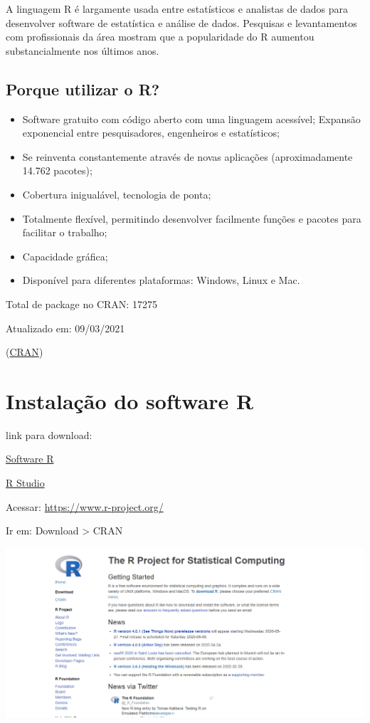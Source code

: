 \documentclass[
]{book}
\providecommand{\tightlist}{%
  \setlength{\itemsep}{0pt}\setlength{\parskip}{0pt}}
\begin{document}
A linguagem R é largamente usada entre estatísticos e analistas de dados para desenvolver software de estatística e análise de dados. Pesquisas e levantamentos com profissionais da área mostram que a popularidade do R aumentou substancialmente nos últimos anos.

\hypertarget{porque-utilizar-o-r}{%
\section{Porque utilizar o R?}\label{porque-utilizar-o-r}}

\begin{itemize}
\tightlist
\item
  Software gratuito com código aberto com uma linguagem acessível; Expansão exponencial entre pesquisadores, engenheiros e estatísticos;
\item
  Se reinventa constantemente através de novas aplicações (aproximadamente 14.762 pacotes);
\item
  Cobertura inigualável, tecnologia de ponta;
\item
  Totalmente flexível, permitindo desenvolver facilmente funções e pacotes para facilitar o trabalho;
\item
  Capacidade gráfica;
\item
  Disponível para diferentes plataformas: Windows, Linux e Mac.
\end{itemize}

Total de package no CRAN: 17275

Atualizado em: 09/03/2021

(\href{https://cran.r-project.org/web/packages/}{CRAN})

\hypertarget{instalauxe7uxe3o-do-software-r}{%
\chapter{Instalação do software R}\label{instalauxe7uxe3o-do-software-r}}

link para download:

\href{https://www.r-project.org/}{Software R}

\href{https://www.rstudio.com/products/rstudio/download/}{R Studio}

Acessar: \url{https://www.r-project.org/}

Ir em: Download \textgreater{} CRAN

\includegraphics{install1.png}
\end{document}
